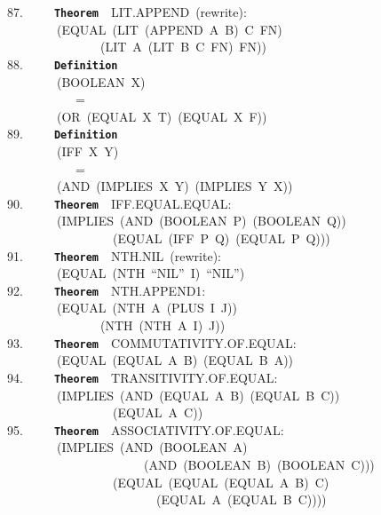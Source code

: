 \documentclass[11pt]{book}
\newenvironment{pubasis}{\begin{flushleft}\ttfamily\small}{\normalsize\rmfamily\end{flushleft}}
\newcommand{\axiomordefinition}[1]{\vspace{6pt}\texttt{\textbf{#1}}}
\begin{document}
\begin{pubasis}
87.~~~~~\axiomordefinition{Theorem}~~LIT.APPEND~(rewrite):\\
~~~~~~~~(EQUAL~(LIT~(APPEND~A~B)~C~FN)\\
~~~~~~~~~~~~~~~(LIT~A~(LIT~B~C~FN)~FN))\\

88.~~~~~\axiomordefinition{Definition}\\
~~~~~~~~(BOOLEAN~X)\\
~~~~~~~~~~~=\\
~~~~~~~~(OR~(EQUAL~X~T)~(EQUAL~X~F))\\

89.~~~~~\axiomordefinition{Definition}\\
~~~~~~~~(IFF~X~Y)\\
~~~~~~~~~~~=\\
~~~~~~~~(AND~(IMPLIES~X~Y)~(IMPLIES~Y~X))\\

90.~~~~~\axiomordefinition{Theorem}~~IFF.EQUAL.EQUAL:\\
~~~~~~~~(IMPLIES~(AND~(BOOLEAN~P)~(BOOLEAN~Q))\\
~~~~~~~~~~~~~~~~~(EQUAL~(IFF~P~Q)~(EQUAL~P~Q)))\\

91.~~~~~\axiomordefinition{Theorem}~~NTH.NIL~(rewrite):\\
~~~~~~~~(EQUAL~(NTH~``NIL''~I)~``NIL'')\\

92.~~~~~\axiomordefinition{Theorem}~~NTH.APPEND1:\\
~~~~~~~~(EQUAL~(NTH~A~(PLUS~I~J))\\
~~~~~~~~~~~~~~~(NTH~(NTH~A~I)~J))\\

93.~~~~~\axiomordefinition{Theorem}~~COM\-MU\-TA\-TIV\-ITY.OF.EQUAL:\\
~~~~~~~~(EQUAL~(EQUAL~A~B)~(EQUAL~B~A))\\

94.~~~~~\axiomordefinition{Theorem}~~TRANSITIVITY.OF.EQUAL:\\
~~~~~~~~(IMPLIES~(AND~(EQUAL~A~B)~(EQUAL~B~C))\\
~~~~~~~~~~~~~~~~~(EQUAL~A~C))\\

95.~~~~~\axiomordefinition{Theorem}~~ASSOC\-IATIV\-ITY.OF.EQUAL:\\
~~~~~~~~(IMPLIES~(AND~(BOOLEAN~A)\\
~~~~~~~~~~~~~~~~~~~~~~(AND~(BOOLEAN~B)~(BOOLEAN~C)))\\
~~~~~~~~~~~~~~~~~(EQUAL~(EQUAL~(EQUAL~A~B)~C)\\
~~~~~~~~~~~~~~~~~~~~~~~~(EQUAL~A~(EQUAL~B~C))))\\


\end{pubasis}
\end{document}
